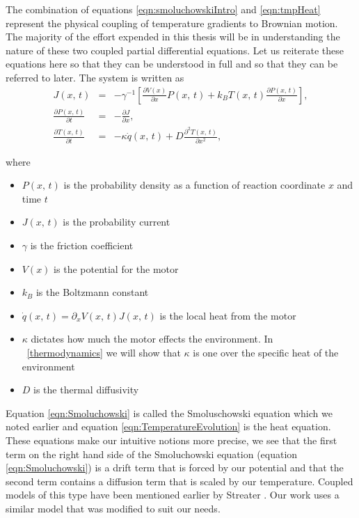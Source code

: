 The combination of equations \ref{eqn:smoluchowskiIntro} and \ref{eqn:tmpHeat} represent the physical coupling of temperature gradients to Brownian motion. The majority of the effort expended in this thesis will be in understanding the nature of these two coupled partial differential equations. Let us reiterate these equations here so that they can be understood in full and so that they can be referred to later. The system is written as
\begin{eqnarray}
J(x, \, t) &=& -\gamma^{-1} \left [ \frac{\partial V(x)}{\partial x} P(x, \, t) + k_B T(x, \, t) \frac{\partial P(x, \, t)}{\partial x} \right ], \label{eqn:current} \\
\frac{\partial P(x, \, t)}{\partial t} &=& -\frac{\partial J}{\partial x}, \label{eqn:Smoluchowski} \\
\frac{\partial T(x, \, t)}{\partial t} &=& -\kappa \dot{q}(x, \, t) + D \frac{\partial^2 T(x, 
\, t)}{\partial x^2}, \label{eqn:TemperatureEvolution}
\end{eqnarray}

where
\begin{itemize}
\item{$P(x, \, t)$ is the probability density as a function of  reaction coordinate $x$ and time $t$}
\item{$J(x, \, t)$ is the probability current}
\item{$\gamma$ is the friction coefficient}
\item{$V(x)$ is the potential for the motor}
\item{$k_B$ is the Boltzmann constant}
\item{$\dot{q}(x, \, t) = \partial_x V(x, \, t) J(x, \, t)$ is the local heat from the motor}
\item{$\kappa$ dictates how much the motor effects the environment. In ~\autoref{thermodynamics} we will show that $\kappa$ is one over the specific heat of the environment}
\item{$D$ is the thermal diffusivity}
\end{itemize}
Equation \ref{eqn:Smoluchowski} is called the Smoluschowski equation which we noted earlier and equation \ref{eqn:TemperatureEvolution} is the heat equation. These equations make our intuitive notions more precise, we see that the first term on the right hand side of the Smoluchowski equation (equation \ref{eqn:Smoluchowski}) is a drift term that is forced by our potential and that the second term contains a diffusion term that is scaled by our temperature.  Coupled models of this type have been mentioned earlier by Streater \cite{Streater1997, Streater1997a,Streater2000,Streater1997b}. Our work uses a similar model that was modified to suit our needs.

